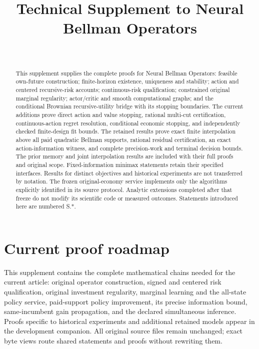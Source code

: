 \documentclass[ecta,nameyear,draft]{econsocart}
\begin{document}
\begin{frontmatter}
\title{Technical Supplement to Neural Bellman Operators}
\begin{aug}
\author[id=au1,addressref={add1}]{~}
\address[id=add1]{Peking University}
\end{aug}
\begin{abstract}
This supplement supplies the complete proofs for Neural Bellman Operators:
feasible own-future construction; finite-horizon existence, uniqueness and
stability; action and centered recursive-risk accounts; continuous-risk
qualification; constrained original marginal regularity; actor/critic and
smooth computational graphs; and the conditional Brownian recursive-utility
bridge with its stopping boundaries. The current additions prove direct action and value stopping, rational multi-cut
certification, continuous-action regret resolution, conditional economic stopping,
and independently checked finite-design fit bounds. The retained results prove exact finite
interpolation above all paid quadratic Bellman supports, rational residual
certification, an exact action-information witness, and complete precision-work
and terminal decision bounds. The prior memory and joint interpolation results
are included with their full proofs and original scope. Fixed-information
minimax statements retain their specified interfaces. Results for distinct
objectives and historical experiments are not transferred by notation.
The frozen original-economy service implements only the algorithms explicitly
identified in its source protocol. Analytic extensions completed after that
freeze do not modify its scientific code or measured outcomes.
Statements introduced here are numbered S.*.
\end{abstract}
\end{frontmatter}
\section{Current proof roadmap}
This supplement contains the complete mathematical chains needed for the
current article: original operator construction, signed and centered risk
qualification, original investment regularity, marginal learning and the
all-state policy service, paid-support policy improvement, its precise
information bound, same-incumbent gain propagation, and the declared simultaneous inference. Proofs specific
to historical experiments and additional retained models appear in the
development companion. All original source files remain unchanged; exact
byte views route shared statements and proofs without rewriting them.




\end{document}

